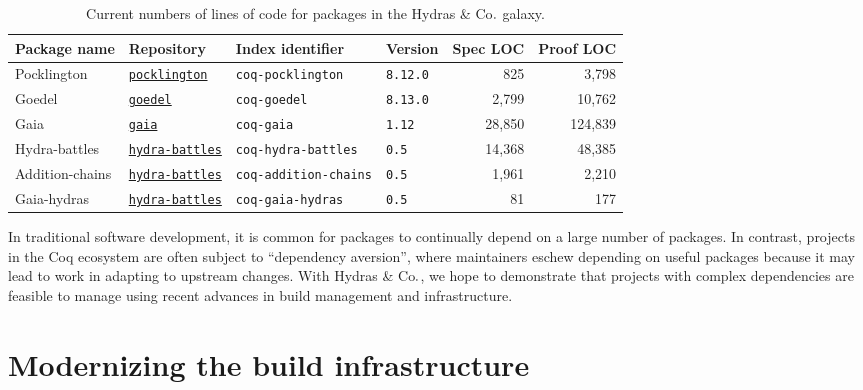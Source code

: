 \documentclass{easychair}
\newcommand{\Hydras}{Hydras \& Co$\text.$\xspace}
\begin{document}
\begin{table}[ht]
\centering
\footnotesize
\begin{tabular}{llllrr}
\hline
\textbf{Package name} & \textbf{Repository} & \textbf{Index identifier} & \textbf{Version} & \textbf{Spec LOC} & \textbf{Proof LOC}\\
\hline
Pocklington & \href{https://github.com/coq-community/pocklington}{\texttt{pocklington}} & \texttt{coq-pocklington} & \texttt{8.12.0} & 825 & 3,798 \\
Goedel & \href{https://github.com/coq-community/goedel}{\texttt{goedel}} & \texttt{coq-goedel} & \texttt{8.13.0} & 2,799 & 10,762 \\
Gaia & \href{https://github.com/coq-community/gaia}{\texttt{gaia}} & \texttt{coq-gaia} & \texttt{1.12} & 28,850 & 124,839 \\
Hydra-battles & \href{https://github.com/coq-community/hydra-battles}{\texttt{hydra-battles}} & \texttt{coq-hydra-battles} & \texttt{0.5} & 14,368 & 48,385 \\
Addition-chains & \href{https://github.com/coq-community/hydra-battles}{\texttt{hydra-battles}} & \texttt{coq-addition-chains} & \texttt{0.5} & 1,961 & 2,210 \\
Gaia-hydras & \href{https://github.com/coq-community/hydra-battles}{\texttt{hydra-battles}} & \texttt{coq-gaia-hydras} & \texttt{0.5} & 81 & 177 \\
\hline
\end{tabular}
\caption{Current numbers of lines of code for packages in the \Hydras galaxy.}
\label{tbl:loc}
\end{table}

In traditional software development, it is common for packages to continually depend on a large number of packages. In contrast, projects in the Coq ecosystem are often subject to ``dependency aversion'', where maintainers eschew depending on useful packages because it may lead to work in adapting to upstream changes. With \Hydras, we hope to demonstrate that projects with complex dependencies are feasible to manage using recent advances in build management and infrastructure.


\section{Modernizing the build infrastructure}
\end{document}
